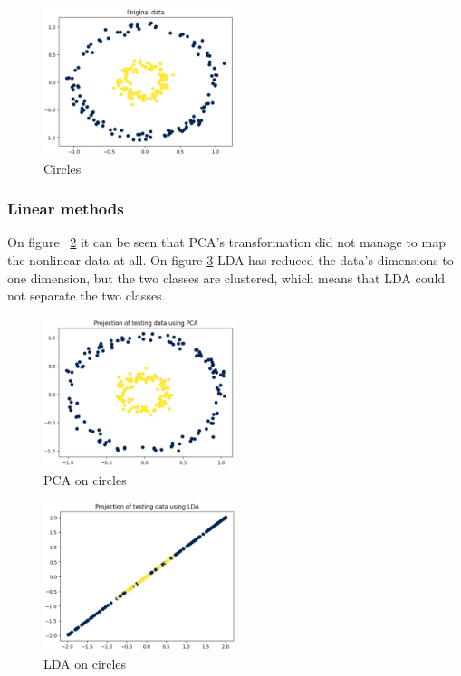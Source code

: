 \begin{figure}[h]
    \centering
    \includegraphics[width=0.5\textwidth]{figures/theory-example-figures/fig-circles.png}
    \caption{Circles}
    \label{fig:circles}
    \end{figure}

\subsubsection{Linear methods}
On figure ~\ref{fig:circles-pca} it can be seen that PCA's transformation did not manage to map the nonlinear data at all. On figure \ref{fig:circles-lda} LDA has reduced the data's dimensions to one dimension, but the two classes are clustered, which means that LDA could not separate the two classes.
\begin{figure}[h]
    \centering
    \includegraphics[width=0.5\textwidth]{figures/theory-example-figures/circles-pca.png}
    \caption{PCA on circles}
    \label{fig:circles-pca}
    \end{figure}

    \begin{figure}[h]
        \centering
        \includegraphics[width=0.5\textwidth]{figures/theory-example-figures/circles-lda.png}
        \caption{LDA on circles}
        \label{fig:circles-lda}
        \end{figure}
    
